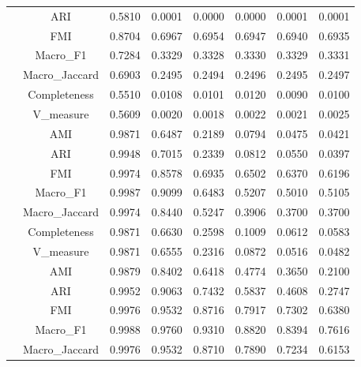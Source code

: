 \begin{table}[ht!]
\begin{tabular*}{\linewidth}{@{} lc c c c c c c @{}}
 & ARI  & 0.5810 & 0.0001 & 0.0000 & 0.0000 & 0.0001 & 0.0001 \\

 & FMI  & 0.8704 & 0.6967 & 0.6954 & 0.6947 & 0.6940 & 0.6935 \\

 & Macro_F1  & 0.7284 & 0.3329 & 0.3328 & 0.3330 & 0.3329 & 0.3331 \\

 & Macro_Jaccard  & 0.6903 & 0.2495 & 0.2494 & 0.2496 & 0.2495 & 0.2497 \\

 & Completeness  & 0.5510 & 0.0108 & 0.0101 & 0.0120 & 0.0090 & 0.0100 \\

 & V_measure  & 0.5609 & 0.0020 & 0.0018 & 0.0022 & 0.0021 & 0.0025 \\
\addlinespace
\multirow{7}{*}{DPC-FWSN}
 & AMI  & 0.9871 & 0.6487 & 0.2189 & 0.0794 & 0.0475 & 0.0421 \\

 & ARI  & 0.9948 & 0.7015 & 0.2339 & 0.0812 & 0.0550 & 0.0397 \\

 & FMI  & 0.9974 & 0.8578 & 0.6935 & 0.6502 & 0.6370 & 0.6196 \\

 & Macro_F1  & 0.9987 & 0.9099 & 0.6483 & 0.5207 & 0.5010 & 0.5105 \\

 & Macro_Jaccard  & 0.9974 & 0.8440 & 0.5247 & 0.3906 & 0.3700 & 0.3700 \\

 & Completeness  & 0.9871 & 0.6630 & 0.2598 & 0.1009 & 0.0612 & 0.0583 \\

 & V_measure  & 0.9871 & 0.6555 & 0.2316 & 0.0872 & 0.0516 & 0.0482 \\
\addlinespace
\multirow{7}{*}{GMM}
 & AMI  & 0.9879 & 0.8402 & 0.6418 & 0.4774 & 0.3650 & 0.2100 \\

 & ARI  & 0.9952 & 0.9063 & 0.7432 & 0.5837 & 0.4608 & 0.2747 \\

 & FMI  & 0.9976 & 0.9532 & 0.8716 & 0.7917 & 0.7302 & 0.6380 \\

 & Macro_F1  & 0.9988 & 0.9760 & 0.9310 & 0.8820 & 0.8394 & 0.7616 \\

 & Macro_Jaccard  & 0.9976 & 0.9532 & 0.8710 & 0.7890 & 0.7234 & 0.6153 \\


\end{tabular*}
\end{table}
